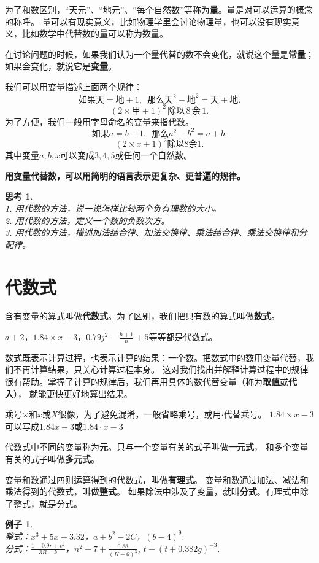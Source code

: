 \documentclass[12pt,UTF8]{ctexbook}
\newtheorem{ex}{例子}[section]
\newtheorem{sk}{思考}[section]
\begin{document}
为了和数区别，“天元”、“地元”、“每个自然数”等称为\textbf{量}。量是对可以运算的概念的称呼。
量可以有现实意义，比如物理学里会讨论物理量，也可以没有现实意义，比如数学中代替数的量可以称为数量。

在讨论问题的时候，如果我们认为一个量代替的数不会变化，就说这个量是\textbf{常量}；如果会变化，就说它是\textbf{变量}。

我们可以用变量描述上面两个规律：
$$ \mbox{如果天} = \mbox{地}+1, \,\,\,\mbox{那么}\mbox{天}^2 - \mbox{地}^2 = \mbox{天} + \mbox{地}. $$
$$  (2\times \mbox{甲} + 1)^2 \,\mbox{除以} \,8\,\mbox{余}\,1.$$
为了方便，我们一般用字母命名的变量来指代数。
$$ \mbox{如果} a = b+1, \,\,\,\mbox{那么} a^2 - b^2 = a + b. $$
$$  (2\times x + 1)^2 \mbox{除以} 8\mbox{余} 1.$$
其中变量$a,b,x$可以变成$3,4,5$或任何一个自然数。

\textbf{用变量代替数，可以用简明的语言表示更复杂、更普遍的规律。}

\begin{sk}\label{sk:1-0-0}
    \mbox{}\\
    1. 用代数的方法，说一说怎样比较两个负有理数的大小。\\
    2. 用代数的方法，定义一个数的负数次方。\\
    3. 用代数的方法，描述加法结合律、加法交换律、乘法结合律、乘法交换律和分配律。
\end{sk}

\section{代数式}
含有变量的算式叫做\textbf{代数式}。为了区别，我们把只有数的算式叫做\textbf{数式}。

$a + 2$，$1.84\times x - 3$，$0.79 j^2 - \frac{h+1}{n} + 5 $等等都是代数式。

数式既表示计算过程，也表示计算的结果：一个数。把数式中的数用变量代替，我们不再计算结果，只关心计算过程本身。
这对我们找出并解释计算过程中的规律很有帮助。掌握了计算的规律后，我们再用具体的数代替变量（称为\textbf{取值}或\textbf{代入}），
就能更快更好地算出结果。

乘号$\times$和$x$或$X$很像，为了避免混淆，一般省略乘号，或用$\cdot$代替乘号。
$1.84\times x - 3$可以写成$1.84 x - 3$或$1.84\cdot x - 3$

代数式中不同的变量称为\textbf{元}。只与一个变量有关的式子叫做\textbf{一元式}，
和多个变量有关的式子叫做\textbf{多元式}。

变量和数通过四则运算得到的代数式，叫做\textbf{有理式}。
变量和数通过加法、减法和乘法得到的代数式，叫做\textbf{整式}。
如果除法中涉及了变量，就叫\textbf{分式}。有理式中除了整式，就是分式。
\begin{ex}\label{ex:1-1-0}
    \mbox{} \\
    \indent 整式：$x^3 + 5x - 3.32$，$a + b^2 - 2C$，$(b - 4)^9.$ \\
    \indent 分式：$\frac{1 - 0.9r + v^2}{3B - k}$，$n^2 - 7 + \frac{0.88}{(H - 6)^3}$, $t - (t + 0.382g)^{-3}.$\\
\end{ex}
\end{document}
